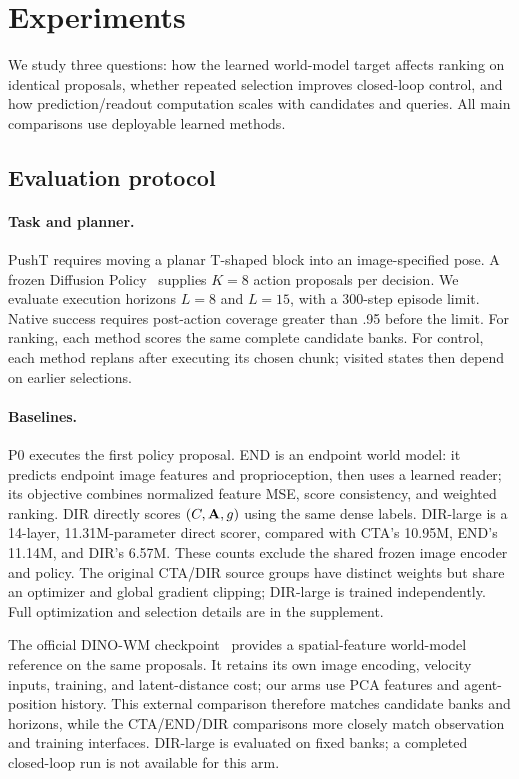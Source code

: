 \section{Experiments}
\label{sec:experiments}
We study three questions: how the learned world-model target affects ranking on identical proposals, whether repeated selection improves closed-loop control, and how prediction/readout computation scales with candidates and queries. All main comparisons use deployable learned methods.

\subsection{Evaluation protocol}
\label{sec:protocol}
\paragraph{Task and planner.}
PushT requires moving a planar T-shaped block into an image-specified pose. A frozen Diffusion Policy~\cite{chi2023diffusion} supplies $K=8$ action proposals per decision. We evaluate execution horizons $L=8$ and $L=15$, with a 300-step episode limit. Native success requires post-action coverage greater than .95 before the limit. For ranking, each method scores the same complete candidate banks. For control, each method replans after executing its chosen chunk; visited states then depend on earlier selections.

\paragraph{Baselines.}
P0 executes the first policy proposal. END is an endpoint world model: it predicts endpoint image features and proprioception, then uses a learned reader; its objective combines normalized feature MSE, score consistency, and weighted ranking. DIR directly scores $(C,\mathbf{A},g)$ using the same dense labels. DIR-large is a 14-layer, 11.31M-parameter direct scorer, compared with CTA's 10.95M, END's 11.14M, and DIR's 6.57M. These counts exclude the shared frozen image encoder and policy. The original CTA/DIR source groups have distinct weights but share an optimizer and global gradient clipping; DIR-large is trained independently. Full optimization and selection details are in the supplement.

The official DINO-WM checkpoint~\cite{zhou2025dinowm} provides a spatial-feature world-model reference on the same proposals. It retains its own image encoding, velocity inputs, training, and latent-distance cost; our arms use PCA features and agent-position history. This external comparison therefore matches candidate banks and horizons, while the CTA/END/DIR comparisons more closely match observation and training interfaces. DIR-large is evaluated on fixed banks; a completed closed-loop run is not available for this arm.


